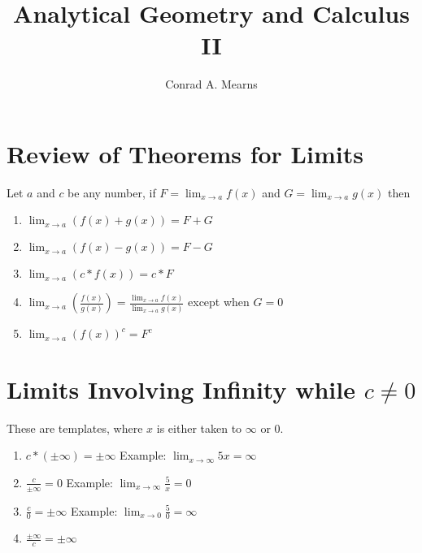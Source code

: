 \documentclass{article}
\title{Analytical Geometry and Calculus II}
\author{Conrad A. Mearns}
\begin{document}
\maketitle

\section{Review of Theorems for Limits}
Let $a$ and $c$ be any number, if $F = \lim_{x \to a}f(x)$ and $G = \lim_{x \to a}g(x)$ then

\begin{enumerate}
  \item $\lim_{x \to a}(f(x) + g(x)) = F + G$
  \item $\lim_{x \to a}(f(x) - g(x)) = F - G$
  \item $\lim_{x \to a}(c * f(x)) = c * F$
  \item $\lim_{x \to a}(\frac{f(x)}{g(x)}) = \frac{\lim_{x \to a}f(x)}{\lim_{x \to a}g(x)}$ except when $G = 0$
  \item $\lim_{x \to a}(f(x))^c = F^c$
\end{enumerate}

\section{Limits Involving Infinity while $c \neq 0$}
These are templates, where $x$ is either taken to $\infty$ or 0.

\begin{enumerate}
  \item $c * (\pm \infty) = \pm \infty$ Example: $\lim_{x \to \infty}5x = \infty$
  \item $\frac{c}{\pm \infty} = 0$ Example: $\lim_{x \to \infty}\frac{5}{x} = 0$
  \item $\frac{c}{0} = \pm \infty$ Example: $\lim_{x \to 0}\frac{5}{0} = \infty$
  \item $\frac{\pm \infty}{c} = \pm \infty$
\end{enumerate}

\end{document}
